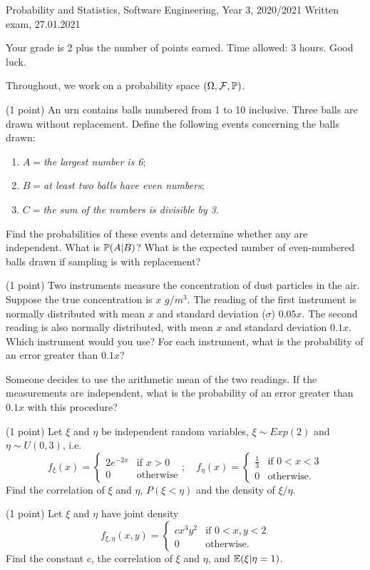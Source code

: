 \documentclass[a4paper]{report}
\begin{document}
\noindent Probability and Statistics, Software Engineering, Year 3, 2020/2021 \hfill Written exam, 27.01.2021

\hrulefill

\begin{it}
Your grade is 2 plus the number of points earned. Time allowed: 3 hours. Good luck.

Throughout, we work on a probability space $(\Omega, \cF, \P)$.
\end{it}

\begin{problem} (1 point)
An urn contains balls numbered from 1 to 10 inclusive.
Three balls are drawn without replacement. Define
the following events concerning the balls drawn:
\begin{enumerate}
    \item $A = $\textit{the largest number is 6};
    \item $B = $\textit{at least two balls have even numbers};
    \item $C = $\textit{the sum of the numbers is divisible by 3}.
    \end{enumerate}
\end{problem}
Find the probabilities of these events and
determine whether any are independent. What is $\P(A|B)$?
What is the expected number of even-numbered balls drawn
if sampling is with replacement?

\begin{problem}(1 point)
Two instruments measure the concentration of dust particles
in the air.
Suppose the true concentration is $x$ $g/m^3$.
The reading of the first instrument
is normally distributed with mean $x$ and standard deviation ($\sigma$) $0.05x$.
The second reading is also normally distributed,
with mean $x$ and standard deviation
$0.1x$. Which instrument would you use?
For each instrument, what is the probability of an error
greater than $0.1x$?

Someone decides to use the arithmetic mean of the two readings.
If the measurements are independent, what is the probability
of an error greater than $0.1x$ with this procedure?
\end{problem}



\begin{problem} (1 point)
Let $\xi$ and $\eta$ be independent random variables,
$\xi\sim Exp(2)$ and $\eta\sim U(0,3)$, i.e.
\[
f_\xi(x) = \begin{cases}
2 e^{-2x} & \text{if } x >0\\
0 & \text{otherwise}
\end{cases}; \quad
f_\eta(x) = \begin{cases}
\frac13 & \text{if } 0<x <3\\
0 & \text{otherwise.}
\end{cases}\]
Find the correlation of $\xi$ and $\eta$, $P(\xi<\eta)$ and the density
of $\xi/\eta$.

\end{problem}

\begin{problem} (1 point)
Let $\xi$ and $\eta$ have joint density
\[
f_{\xi, \eta}(x, y) = \begin{cases}
c x^3 y^2 & \text{if } 0<x,y<2\\
0 & \text{otherwise.}
\end{cases}
\]
Find the constant $c$, the correlation of $\xi$ and $\eta$, and
$\E(\xi| \eta = 1)$.
\end{problem}
\end{document}
